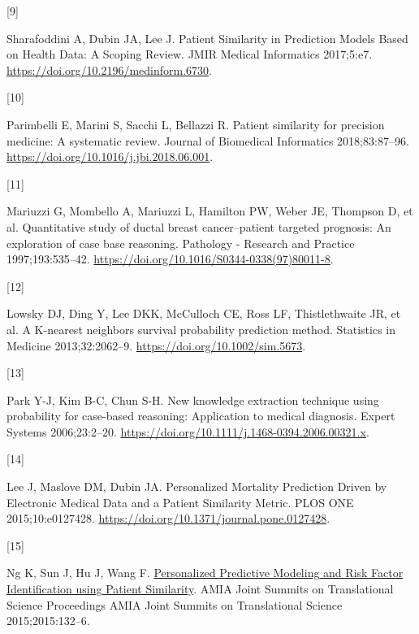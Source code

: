 \documentclass[preprint, 3p,
authoryear]{elsarticle} %
\newlength{\cslhangindent}
\newlength{\csllabelwidth}
\newlength{\cslentryspacingunit} %
\newenvironment{CSLReferences}[2] %
 {%
  \setlength{\parindent}{0pt}
  \ifodd #1
  \let\oldpar\par
  \def\par{\hangindent=\cslhangindent\oldpar}
  \fi
  \setlength{\parskip}{#2\cslentryspacingunit}
 }%
 {}
\newcommand{\CSLLeftMargin}[1]{\parbox[t]{\csllabelwidth}{#1}}
\newcommand{\CSLRightInline}[1]{\parbox[t]{\linewidth - \csllabelwidth}{#1}\break}
\begin{document}
\begin{CSLReferences}{0}{0}
\leavevmode{}%
\CSLLeftMargin{{[}9{]} }%
\CSLRightInline{Sharafoddini A, Dubin JA, Lee J. Patient {Similarity} in
{Prediction Models Based} on {Health Data}: {A Scoping Review}. JMIR
Medical Informatics 2017;5:e7.
\url{https://doi.org/10.2196/medinform.6730}.}

\leavevmode{}%
\CSLLeftMargin{{[}10{]} }%
\CSLRightInline{Parimbelli E, Marini S, Sacchi L, Bellazzi R. Patient
similarity for precision medicine: {A} systematic review. Journal of
Biomedical Informatics 2018;83:87--96.
\url{https://doi.org/10.1016/j.jbi.2018.06.001}.}

\leavevmode{}%
\CSLLeftMargin{{[}11{]} }%
\CSLRightInline{Mariuzzi G, Mombello A, Mariuzzi L, Hamilton PW, Weber
JE, Thompson D, et al. Quantitative study of ductal breast
cancer--patient targeted prognosis: An exploration of case base
reasoning. Pathology - Research and Practice 1997;193:535--42.
\url{https://doi.org/10.1016/S0344-0338(97)80011-8}.}

\leavevmode{}%
\CSLLeftMargin{{[}12{]} }%
\CSLRightInline{Lowsky DJ, Ding Y, Lee DKK, McCulloch CE, Ross LF,
Thistlethwaite JR, et al. A {K-nearest} neighbors survival probability
prediction method. Statistics in Medicine 2013;32:2062--9.
\url{https://doi.org/10.1002/sim.5673}.}

\leavevmode{}%
\CSLLeftMargin{{[}13{]} }%
\CSLRightInline{Park Y-J, Kim B-C, Chun S-H. New knowledge extraction
technique using probability for case-based reasoning: Application to
medical diagnosis. Expert Systems 2006;23:2--20.
\url{https://doi.org/10.1111/j.1468-0394.2006.00321.x}.}

\leavevmode{}%
\CSLLeftMargin{{[}14{]} }%
\CSLRightInline{Lee J, Maslove DM, Dubin JA. Personalized {Mortality
Prediction Driven} by {Electronic Medical Data} and a {Patient
Similarity Metric}. PLOS ONE 2015;10:e0127428.
\url{https://doi.org/10.1371/journal.pone.0127428}.}

\leavevmode{}%
\CSLLeftMargin{{[}15{]} }%
\CSLRightInline{Ng K, Sun J, Hu J, Wang F.
\href{https://www.ncbi.nlm.nih.gov/pmc/articles/PMC4525240}{Personalized
{Predictive Modeling} and {Risk Factor Identification} using {Patient
Similarity}}. AMIA Joint Summits on Translational Science Proceedings
AMIA Joint Summits on Translational Science 2015;2015:132--6.}


\end{CSLReferences}
\end{document}
